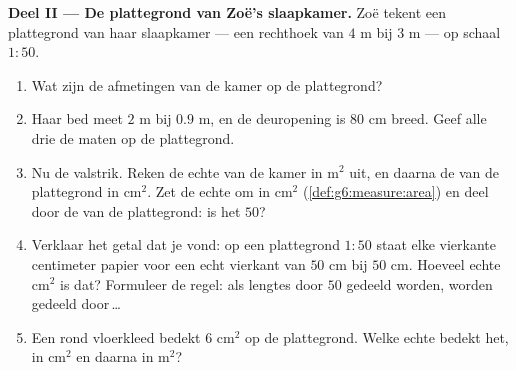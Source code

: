 \begin{problem}
\medskip
\noindent\textbf{Deel II --- De plattegrond van Zoë's slaapkamer.}
Zoë tekent een plattegrond van haar slaapkamer --- een rechthoek van $4$ m bij
$3$ m --- op schaal $1:50$.
\begin{enumerate}[resume]
  \item Wat zijn de afmetingen van de kamer op de plattegrond?
  \item Haar bed meet $2$ m bij $0.9$ m, en de deuropening is $80$ cm breed.
        Geef alle drie de maten op de plattegrond.
  \item Nu de valstrik. Reken de echte  van de kamer in m$^2$ uit, en
        daarna de  van de plattegrond in cm$^2$. Zet de echte
         om in cm$^2$ (\cref{def:g6:measure:area}) en deel door de
         van de plattegrond: is het  $50$?
  \item Verklaar het getal dat je vond: op een plattegrond $1:50$ staat elke
        vierkante centimeter papier voor een echt vierkant van $50$ cm bij $50$
        cm. Hoeveel echte cm$^2$ is dat? Formuleer de regel: als lengtes door
        $50$ gedeeld worden, worden  gedeeld door\,\dots
  \item Een rond vloerkleed bedekt $6$ cm$^2$ op de plattegrond. Welke echte
         bedekt het, in cm$^2$ en daarna in m$^2$?
\end{enumerate}


\end{problem}
